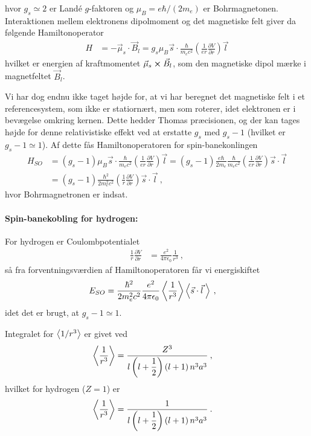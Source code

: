 hvor $g_s \simeq 2$ er Landé $g$-faktoren og $\mu_B = e\hbar/(2m_e)$ er Bohrmagnetonen.\\
Interaktionen mellem elektronens dipolmoment og det magnetiske felt giver da følgende Hamiltonoperator
\begin{align}
    H &= - \Vec{\mu}_s \cdot \Vec{B}_l = g_s \mu_B \Vec{s} \cdot \frac{\hbar}{m_e c^2} \left(\frac{1}{e r} \frac{\partial V}{\partial r} \right) \Vec{l}
\end{align}
hvilket er energien af kraftmomentet $\Vec{\mu}_s \cross \Vec{B}_l$, som den magnetiske dipol mærke i magnetfeltet $\Vec{B}_l$.

Vi har dog endnu ikke taget højde for, at vi har beregnet det magnetiske felt i et referencesystem, som ikke er statiornært, men som roterer, idet elektronen er i bevægelse omkring kernen. Dette hedder \textsf{Thomas præcisionen}, og der kan tages højde for denne relativistiske effekt ved at erstatte $g_s$ med $g_s - 1$ (hvilket er $g_s - 1 \simeq 1$). Af dette fås Hamiltonoperatoren for spin-banekonlingen
\begin{align}
    H_{SO} &= (g_s - 1) \mu_B \Vec{s} \cdot \frac{\hbar}{m_e c^2} \left(\frac{1}{e r} \frac{\partial V}{\partial r} \right) \Vec{l} = (g_s - 1) \frac{e\hbar}{2m_e} \frac{\hbar}{m_e c^2} \left(\frac{1}{e r} \frac{\partial V}{\partial r} \right) \Vec{s} \cdot \Vec{l} \nonumber\\
    &= (g_s - 1) \frac{\hbar^2}{2m_e^2c^2} \left(\frac{1}{r} \frac{\partial V}{\partial r} \right) \Vec{s} \cdot \Vec{l} \: ,
\end{align}
hvor Bohrmagnetronen er indsat.\\


\paragraph{Spin-banekobling for hydrogen:}
For hydrogen er Coulombpotentialet
\begin{align}
    \frac{1}{r} \frac{\partial V}{\partial r} &= \frac{e^2}{4\pi\epsilon_0} \frac{1}{r^3} \: ,
\end{align}
så fra forventningsværdien af Hamiltonoperatoren får vi energiskiftet
\begin{align}
    E_{SO} &= \frac{\hbar^2}{2m_e^2c^2} \frac{e^2}{4\pi\epsilon_0} \Braket{\frac{1}{r^3}} \Braket{\Vec{s} \cdot \Vec{l} \:} \: ,
\end{align}
idet det er brugt, at $g_s - 1 \simeq 1$.

Integralet for $\Braket{1/r^3}$ er givet ved
\begin{align}
    \Braket{\frac{1}{r^3}} &= \dfrac{Z^3}{l\left(l+\dfrac{1}{2}\right)\left(l + 1\right) n^3a^3} \: ,
\end{align}
hvilket for hydrogen ($Z = 1$) er
\begin{align} \label{eq:Q10_<1/r^3>ForHydrogen}
    \Braket{\frac{1}{r^3}} &= \dfrac{1}{l\left(l+\dfrac{1}{2}\right)\left(l + 1\right) n^3a^3} \: .
\end{align}

